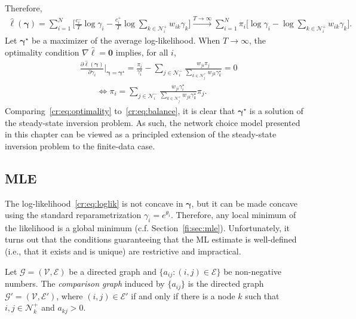 Therefore,
\begin{align*}
\hat{\ell}(\bm{\gamma})
    = \sum_{i = 1}^N \bigg[ \frac{c^-_i}{T} \log \gamma_i - \frac{c^+_i}{T} \log \sum_{k \in \mathcal{N}^+_i} w_{ik} \gamma_k \bigg]
    \xrightarrow{T \to \infty} \sum_{i = 1}^N \pi_i \bigg[ \log \gamma_i - \log \sum_{k \in \mathcal{N}^+_i} w_{ik} \gamma_k \bigg].
\end{align*}
Let $\bm{\gamma}^\star$ be a maximizer of the average log-likelihood.
When $T \to \infty$, the optimality condition $\nabla \hat{\ell} = \bm{0}$ implies, for all $i$,
\begin{align}
&\frac{\partial \hat{\ell}(\bm{\gamma})}{\partial \gamma_i} \bigg|_{\bm{\gamma} = \bm{\gamma}^\star}
    = \frac{\pi_i}{\gamma^\star_i} - \sum_{j \in \mathcal{N}^-_i} \frac{w_{ji} \pi_j}{\sum_{k \in \mathcal{N}^+_j} w_{jk} \gamma^\star_k}
    = 0 \nonumber \\
&\qquad \iff \pi_i = \sum_{j \in \mathcal{N}^-_i} \frac{w_{ji} \gamma^\star_i}{\sum_{k \in \mathcal{N}^+_j} w_{jk} \gamma^\star_k} \pi_j. \label{cr:eq:optimality}
\end{align}
Comparing~\eqref{cr:eq:optimality} to~\eqref{cr:eq:balance}, it is clear that $\bm{\gamma}^\star$ is a solution of the steady-state inversion problem.
As such, the network choice model presented in this chapter can be viewed as a principled extension of the steady-state inversion problem to the finite-data case.


\subsection{MLE}
\label{cr:sec:maxlik}

The log-likelihood~\eqref{cr:eq:loglik} is not concave in $\bm{\gamma}$, but it can be made concave using the standard reparametrization $\gamma_i = e^{\theta_i}$.
Therefore, any local minimum of the likelihood is a global minimum (c.f. Section~\ref{fi:sec:mle}).
Unfortunately, it turns out that the conditions guaranteeing that the ML estimate is well-defined (i.e., that it exists and is unique) are restrictive and impractical.

\begin{definition}
Let $\mathcal{G} = (\mathcal{V}, \mathcal{E})$ be a directed graph and $\{ a_{ij} : (i,j) \in \mathcal{E} \}$ be non-negative numbers.
The \emph{comparison graph} induced by $\{ a_{ij} \}$ is the directed graph $\mathcal{G}' = (\mathcal{V}, \mathcal{E}')$, where $(i,j) \in \mathcal{E}'$ if and only if there is a node $k$ such that $i, j \in \mathcal{N}^+_k$ and $a_{kj} > 0$.
\end{definition}

